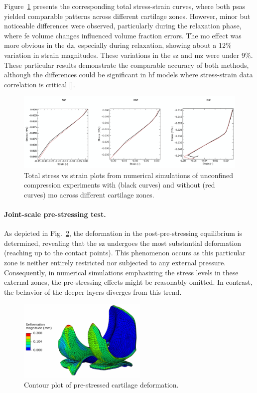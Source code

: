 \documentclass[12pt,a4paper]{report}
\begin{document}
Figure~\ref{fig:total_stress_strain} presents the corresponding total stress-strain curves, where both \acp{psa} yielded comparable patterns across different cartilage zones. However, minor but noticeable differences were observed, particularly during the relaxation phase, where \ac{fe} volume changes influenced volume fraction errors. The \ac{mo} effect was more obvious in the \ac{dz}, especially during relaxation, showing about a 12\% variation in strain magnitudes. These variations in the \ac{sz} and \ac{mz} were under 9\%. These particular results demonstrate the comparable accuracy of both methods, although the differences could be significant in \ac{hf} models where stress-strain data correlation is critical [\cite{eskelinen2019,liu2020,stender2016,hosseini2014}].
%
\begin{figure}
\includegraphics[width=\textwidth]{img/total_stress_strain.jpg}
\caption{Total stress vs strain plots from numerical simulations of unconfined compression experiments with (black curves) and without (red curves) \ac{mo} across different cartilage zones.}
\label{fig:total_stress_strain}
\end{figure}

\paragraph{Joint-scale pre-stressing test.} As depicted in Fig.~\ref{fig:deformation}, the deformation in the post-pre-stressing equilibrium is determined, revealing that the \ac{sz} undergoes the most substantial deformation (reaching up to the contact points). This phenomenon occurs as this particular zone is neither entirely restricted nor subjected to any external pressure. Consequently, in numerical simulations emphasizing the stress levels in these external zones, the pre-stressing effects might be reasonably omitted. In contrast, the behavior of the deeper layers diverges from this trend.
%
\begin{figure}\centering
\includegraphics[width=0.55\textwidth]{img/deformation.jpg}
\caption{Contour plot of pre-stressed cartilage deformation.}
\label{fig:deformation}
\end{figure}
\end{document}
